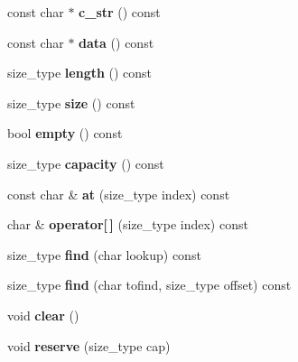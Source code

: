 \begin{DoxyCompactItemize}
const char $\ast$ {\bfseries c\+\_\+str} () const
\item 
\mbox{\label{classTiXmlString_a0e010e1737cfc3ee885b42875171b88e}} 
const char $\ast$ {\bfseries data} () const
\item 
\mbox{\label{classTiXmlString_a5db17f8314ffe2a89df0f0eb6c2a4bf5}} 
size\+\_\+type {\bfseries length} () const
\item 
\mbox{\label{classTiXmlString_a483d85103d2a3ba8c0831e205c832f33}} 
size\+\_\+type {\bfseries size} () const
\item 
\mbox{\label{classTiXmlString_a3139aafb0f0a8e26d1a4ed58a50f3678}} 
bool {\bfseries empty} () const
\item 
\mbox{\label{classTiXmlString_a0ca248f026e698f79b8aa4c9ab8e1571}} 
size\+\_\+type {\bfseries capacity} () const
\item 
\mbox{\label{classTiXmlString_a7f33c37f7dfde5193f02521d2a7af1db}} 
const char \& {\bfseries at} (size\+\_\+type index) const
\item 
\mbox{\label{classTiXmlString_a06e8c84831fc146610369405f4aa4200}} 
char \& {\bfseries operator\mbox{[}$\,$\mbox{]}} (size\+\_\+type index) const
\item 
\mbox{\label{classTiXmlString_a22fc54a23c5a0ab771331a25a769516e}} 
size\+\_\+type {\bfseries find} (char lookup) const
\item 
\mbox{\label{classTiXmlString_a2d66cfd6986faceda62ca62db553a921}} 
size\+\_\+type {\bfseries find} (char tofind, size\+\_\+type offset) const
\item 
\mbox{\label{classTiXmlString_ab20e06e4c666abf3bdbfb3a1191d4888}} 
void {\bfseries clear} ()
\item 
\mbox{\label{classTiXmlString_a88ecf9f0f00cb5c67b6b637958d7049c}} 
void {\bfseries reserve} (size\+\_\+type cap)
\item 
\mbox{\label{classTiXmlString_ac72f3d9149b7812c1e6c59402014d0d5}} 

\end{DoxyCompactItemize}
